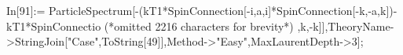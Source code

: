 In[91]:= ParticleSpectrum[-(kT1*SpinConnection[-i,a,i]*SpinConnection[-k,-a,k])-kT1*SpinConnectio (*omitted 2216 characters for brevity*) ,k,-k]],TheoryName->StringJoin["Case",ToString[49]],Method->"Easy",MaxLaurentDepth->3];
